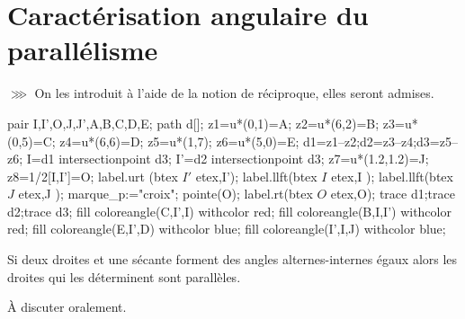 \section{Caractérisation angulaire du parallélisme}
\begin{remarque}
    $\ggg$ On les introduit à l'aide de la notion de réciproque, elles seront admises.
\end{remarque}

\begin{propriete}
    \begin{minipage}{0.3\linewidth}
        \begin{center}           
            \begin{Geometrie}[CoinBG={(0,0.5u)},CoinHD={(6u,6u)}]
                pair I,I',O,J,J',A,B,C,D,E;
                path d[];
                z1=u*(0,1)=A;
                z2=u*(6,2)=B;
                z3=u*(0,5)=C;
                z4=u*(6,6)=D;
                z5=u*(1,7);
                z6=u*(5,0)=E;
                d1=z1--z2;d2=z3--z4;d3=z5--z6;
                I=d1 intersectionpoint d3;
                I'=d2 intersectionpoint d3;
                z7=u*(1.2,1.2)=J;
                z8=1/2[I,I']=O;
                label.urt (btex $I'$ etex,I');
                label.llft(btex $I $ etex,I );
                label.llft(btex $J $ etex,J );
                marque_p:="croix";
                pointe(O);
                label.rt(btex $O$ etex,O);
                trace d1;trace d2;trace d3;
                fill coloreangle(C,I',I) withcolor red;
                fill coloreangle(B,I,I') withcolor red;
                fill coloreangle(E,I',D) withcolor blue;
                fill coloreangle(I',I,J) withcolor blue;
           \end{Geometrie}
        \end{center}
    \end{minipage}
    \hfill
    \begin{minipage}{0.6\linewidth}
        Si deux droites et une sécante forment des angles alternes-internes égaux alors les droites qui les déterminent sont parallèles.
    \end{minipage}
\end{propriete}

\begin{preuve}
    À discuter oralement.
\end{preuve}

